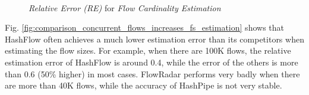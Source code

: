 \begin{figure}[ht!]
    \centering
    \mbox{
    }
    \caption{\emph{Relative Error (RE)} for \emph{Flow Cardinality Estimation}}
    \label{fig:comparison_concurrent_flows_increases_cardinality}
\end{figure}

Fig. \ref{fig:comparison_concurrent_flows_increases_fs_estimation} 
shows that HashFlow often achieves a much lower estimation error 
than its competitors when estimating the flow sizes. For example, when there are 100K flows, the relative estimation error
of HashFlow is around 0.4, while the error of the others is more than 0.6 (50\% higher) in most cases. 
FlowRadar performs very badly when there are more than 40K flows, 
while the accuracy of HashPipe is not very stable.


